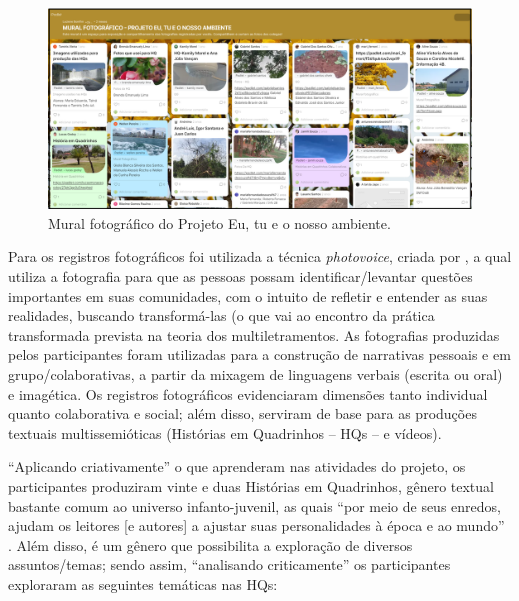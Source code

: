 \begin{figure}[htbp]
\centering
\begin{minipage}{.9\textwidth}
\includegraphics[width=\textwidth]{figure04.png}
\caption{Mural fotográfico do Projeto Eu, tu e o nosso ambiente.}\label{fig-04}
\end{minipage}
\end{figure}
  
Para os registros fotográficos foi utilizada a técnica \textit{photovoice}, criada por \textcite{wang_photovoice:_1997}, a qual utiliza a fotografia para que as pessoas possam identificar/levantar questões importantes em suas comunidades, com o intuito de refletir e entender as suas realidades, buscando transformá-las (o que vai ao encontro da {\textquotedbl}prática transformada{\textquotedbl} prevista na teoria dos multiletramentos. As fotografias produzidas pelos participantes foram utilizadas para a construção de narrativas pessoais e em grupo/colaborativas, a partir da mixagem de linguagens verbais (escrita ou oral) e imagética. Os registros fotográficos evidenciaram dimensões tanto individual quanto colaborativa e social; além disso, serviram de base para as produções textuais multissemióticas (Histórias em Quadrinhos – HQs – e vídeos).

“Aplicando criativamente” o que aprenderam nas atividades do projeto, os participantes produziram vinte e duas Histórias em Quadrinhos, gênero textual bastante comum ao universo infanto-juvenil, as quais “por meio de seus enredos, ajudam os leitores [e autores] a ajustar suas personalidades à época e ao mundo” \cite[p. 34]{carvalho_educacao_2007}. Além disso, é um gênero que possibilita a exploração de diversos assuntos/temas; sendo assim, “analisando criticamente” os participantes exploraram as seguintes temáticas nas HQs: 

